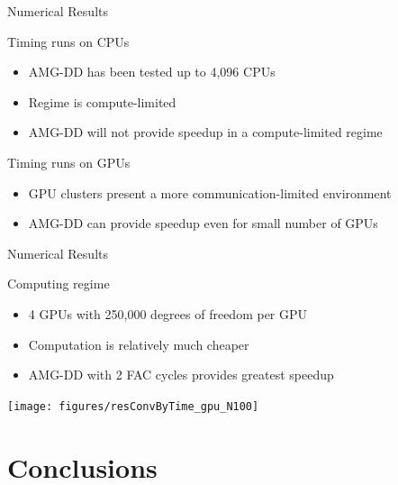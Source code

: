 \documentclass[18pt,xcolor=table]{beamer}
\begin{document}
\begin{frame}{Numerical Results}
\begin{block}{Timing runs on CPUs}
\begin{itemize}
\item AMG-DD has been tested up to 4,096 CPUs
\item Regime is compute-limited
\item AMG-DD will not provide speedup in a compute-limited regime
\end{itemize}
\end{block}

\begin{block}{Timing runs on GPUs}
\begin{itemize}
\item GPU clusters present a more communication-limited environment
\item AMG-DD can provide speedup even for small number of GPUs
\end{itemize}
\end{block}

\end{frame}

\begin{frame}{Numerical Results}
\begin{block}{Computing regime}
\begin{itemize}
\item 4 GPUs with 250,000 degrees of freedom per GPU
   \item Computation is relatively much cheaper
   \item AMG-DD with 2 FAC cycles provides greatest speedup
\end{itemize}
\end{block}

\centering
\vspace{0.5 cm}
\texttt{[image: figures/resConvByTime\_gpu\_N100]}

\end{frame}



\section{Conclusions}
\end{document}
